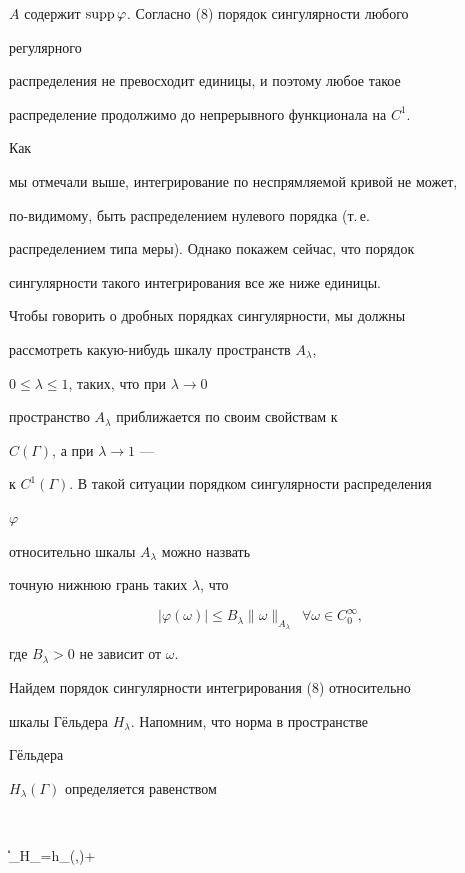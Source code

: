 $A$ содержит $\operatorname{supp}\varphi$. Согласно (8) порядок сингулярности любого 


регулярного 


распределения не превосходит единицы, и поэтому любое такое 


распределение продолжимо до непрерывного функционала на $C^1$. 


Как 


мы отмечали выше, интегрирование по неспрямляемой кривой не может, 


по-видимому, быть распределением нулевого порядка (т.\,е.  


распределением типа меры). Однако покажем сейчас, что порядок 


сингулярности такого интегрирования все же ниже единицы. 


 


Чтобы говорить о дробных порядках сингулярности, мы должны 


рассмотреть какую-нибудь шкалу пространств $A_\lambda$, 


$0\le\lambda\le 1$, таких, что при $\lambda\to 0$ 


пространство $A_\lambda$ приближается по своим свойствам к 


$C(\Gamma)$, а при $\lambda\to 1$ --- 


к $C^1(\Gamma)$. В такой ситуации порядком сингулярности распределения 


$\varphi$ 


относительно шкалы $A_\lambda$ можно назвать 


точную нижнюю грань таких $\lambda$, что 


$$ 


|\varphi(\omega)|\le B_\lambda\|\omega\|_{A_\lambda}\ \; 


\forall\omega\in C^\infty_0, 


$$ 


где $B_\lambda>0$ не зависит от $\omega$. 


 


Найдем порядок сингулярности интегрирования (8) относительно 


шкалы Г\"ельдера $H_\lambda$. Напомним, что норма в пространстве 


Г\"ельдера 


$H_\lambda(\Gamma)$ определяется равенством 


$$ 


\|\omega\|_{H_\lambda}=h_\lambda(\omega,\Gamma)+ 


